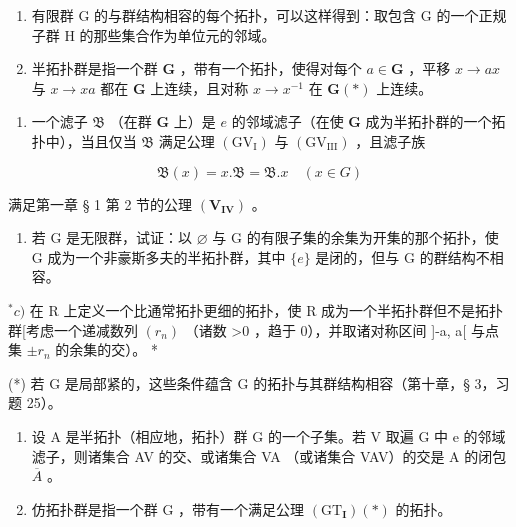 \BourbakiExerciseGroup

\begin{enumerate}
\def\labelenumi{\arabic{enumi})}
\item
  有限群 G 的与群结构相容的每个拓扑，可以这样得到：取包含 G 的一个正规子群 H 的那些集合作为单位元的邻域。
\item
半拓扑群是指一个群 \(\mathbf{G}\) ，带有一个拓扑，使得对每个 \(a \in \mathbf{G}\) ，平移 \(x \to ax\) 与 \(x \to xa\) 都在 \(\mathbf{G}\) 上连续，且对称 \(x \to x^{-1}\) 在 \(\mathbf{G}(*)\) 上连续。
\end{enumerate}

\begin{enumerate}
\def\labelenumi{\alph{enumi})}
\tightlist
\item
  一个滤子 \(\mathfrak{B}\) （在群 \(\mathbf{G}\) 上）是 \(e\) 的邻域滤子（在使 \(\mathbf{G}\) 成为半拓扑群的一个拓扑中），当且仅当 \(\mathfrak{B}\) 满足公理 \((\mathrm{GV}_{\mathrm{I}})\) 与 \((\mathrm{GV}_{\mathrm{III}})\) ，且滤子族
\end{enumerate}

\[
\mathfrak {B} (x) = x. \mathfrak {B} = \mathfrak {B}. x \quad (x \in G)
\]

满足第一章 § 1 第 2 节的公理 \((\mathbf{V}_{\mathbf{IV}})\) 。

\begin{enumerate}
\def\labelenumi{\alph{enumi})}
\setcounter{enumi}{1}
\tightlist
\item
  若 G 是无限群，试证：以 \(\varnothing\) 与 G 的有限子集的余集为开集的那个拓扑，使 G 成为一个非豪斯多夫的半拓扑群，其中 \(\{e\}\) 是闭的，但与 G 的群结构不相容。
\end{enumerate}

\(^{*}c)\) 在 R 上定义一个比通常拓扑更细的拓扑，使 R 成为一个半拓扑群但不是拓扑群{[}考虑一个递减数列 \((r_{n})\) （诸数 \textgreater0 ，趋于 0），并取诸对称区间 {]}-a, a{[} 与点集 \(\pm r_{n}\) 的余集的交）。 *

(*) 若 G 是局部紧的，这些条件蕴含 G 的拓扑与其群结构相容（第十章，§ 3，习题 25）。

\begin{enumerate}
\def\labelenumi{\arabic{enumi})}
\setcounter{enumi}{2}
\item
  设 A 是半拓扑（相应地，拓扑）群 G 的一个子集。若 V 取遍 G 中 e 的邻域滤子，则诸集合 AV 的交、或诸集合 VA （或诸集合 VAV）的交是 A 的闭包 \(\overline{A}\) 。
\item
  仿拓扑群是指一个群 G ，带有一个满足公理 \((\mathrm{GT}_{\mathbf{I}})(*)\) 的拓扑。
\end{enumerate}

